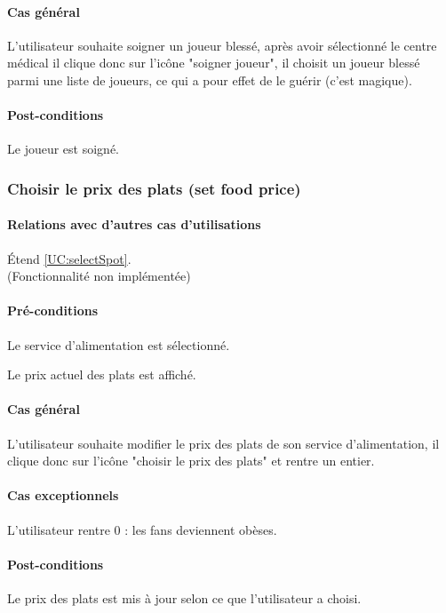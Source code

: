 \paragraph{Cas général}
L'utilisateur souhaite soigner un joueur blessé, après avoir sélectionné le centre médical il clique donc sur l'icône "soigner joueur", il choisit un joueur blessé parmi une liste de joueurs, ce qui a pour effet de le guérir (c'est magique).
\paragraph{Post-conditions}
\begin{list}{}{\leftmargin=1.5em}
\item{Le joueur est soigné.}
\end{list}

\subsubsection{Choisir le prix des plats (set food price)}
\label{UC:setFoodPrice}
\paragraph{Relations avec d'autres cas d'utilisations}
Étend \ref{UC:selectSpot}.
\\(Fonctionnalité non implémentée)
\paragraph{Pré-conditions}
\begin{list}{}{\leftmargin=1.5em}
\item{Le service d'alimentation est sélectionné.}
\item{Le prix actuel des plats est affiché.}
\end{list}
\paragraph{Cas général}
L'utilisateur souhaite modifier le prix des plats de son service d'alimentation, il clique donc sur l'icône "choisir le prix des plats" et rentre un entier.
\paragraph{Cas exceptionnels}
L'utilisateur rentre 0 : les fans deviennent obèses. 
\paragraph{Post-conditions}
\begin{list}{}{\leftmargin=1.5em}
\item{Le prix des plats est mis à jour selon ce que l'utilisateur a choisi.}
\end{list}

